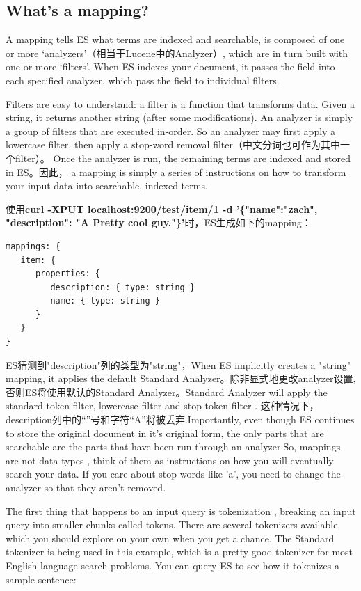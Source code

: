 \subsection{What's a mapping?}
\par A mapping tells ES what terms are indexed and searchable, is composed of one or more ‘analyzers’（相当于Lucene中的Analyzer）, which are in turn built with one or more ‘filters’. When ES indexes your document, it passes the field into each specified analyzer, which pass the field to individual filters.
\par Filters are easy to understand: a filter is a function that transforms data. Given a string, it returns another string (after some modifications). An analyzer is simply a group of filters that are executed in-order. So an analyzer may first apply a lowercase filter, then apply a stop-word removal filter（中文分词也可作为其中一个filter）。 Once the analyzer is run, the remaining terms are indexed and stored in ES。因此， a mapping is simply a series of instructions on how to transform your input data into searchable, indexed terms.
\par 使用\textbf{curl -XPUT localhost:9200/test/item/1 -d '\{"name":"zach", "description": "A Pretty cool guy."\}'}时，ES生成如下的mapping：
\begin{verbatim}
mappings: {
   item: {
      properties: {
         description: { type: string }
         name: { type: string }
      }
   }
}
\end{verbatim}
\par ES猜测到"description"列的类型为"string"，When ES implicitly creates a "string" mapping, it applies the default Standard Analyzer。除非显式地更改analyzer设置,否则ES将使用默认的Standard Analyzer。Standard Analyzer will apply the standard token filter, lowercase filter and stop token filter . 这种情况下，description列中的“.”号和字符“A”将被丢弃.Importantly, even though ES continues to store the original document in it’s original form, the only parts that are searchable are the parts that have been run through an analyzer.So, mappings are not data-types , think of them as instructions on how you will eventually search your data. If you care about stop-words like 'a', you need to change the analyzer so that they aren’t removed.
\par The first thing that happens to an input query is tokenization , breaking an input query into smaller chunks called tokens. There are several tokenizers available, which you should explore on your own when you get a chance. The Standard tokenizer is being used in this example, which is a pretty good tokenizer for most English-language search problems. You can query ES to see how it tokenizes a sample sentence:
